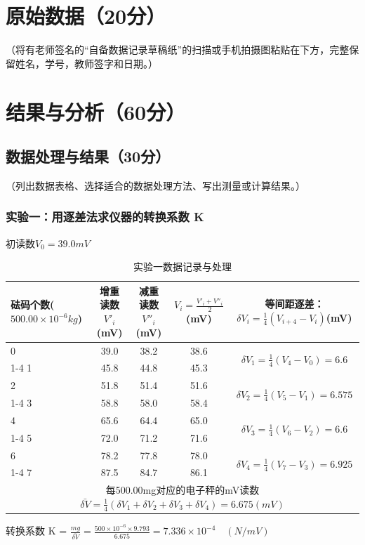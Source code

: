 \documentclass[]{../template/Report}%
\begin{document}
\begin{fullreportonly}
\section{原始数据（20分）}
（将有老师签名的“自备数据记录草稿纸”的扫描或手机拍摄图粘贴在下方，完整保留姓名，学号，教师签字和日期。）

\section{结果与分析（60分）}
\subsection{数据处理与结果（30分）}
（列出数据表格、选择适合的数据处理方法、写出测量或计算结果。）
\subsubsection{实验一：用逐差法求仪器的转换系数 K}
初读数$V_0 = 39.0mV$
\begin{table}[H]
    \centering
    \caption{实验一数据记录与处理}
    \begin{tabular}{|p{6em}|c|c|c|c|}
        \hline
        \textbf{砝码个数($500.00 \times 10^{-6}kg$)} & \textbf{增重读数$V'_i$(mV)} & \textbf{减重读数$V''_i$(mV)} & $V_i = \frac{V'_i + V''_i}{2}$(mV) & \textbf{等间距逐差：$\delta V_i = \frac{1}{4}(V_{i+4} - V_i)$(mV)}  \\
        \hline
        0 & 39.0 & 38.2 & 38.6 & \multirow{2}{*}{$\delta V_1=\frac{1}{4}(V_4-V_0) = 6.6$} \\
        \cline{1-4}
        1 & 45.8 & 44.8 & 45.3 &  \\
        \hline
        2 & 51.8 & 51.4 & 51.6 & \multirow{2}{*}{$\delta V_2=\frac{1}{4}(V_5-V_1) = 6.575$} \\
        \cline{1-4}
        3 & 58.8 & 58.0 & 58.4 &  \\
        \hline
        4 & 65.6 & 64.4 & 65.0 & \multirow{2}{*}{$\delta V_3=\frac{1}{4}(V_6-V_2) = 6.6$} \\
        \cline{1-4}
        5 & 72.0 & 71.2 & 71.6 &  \\
        \hline
        6 & 78.2 & 77.8 & 78.0 & \multirow{2}{*}{$\delta V_4=\frac{1}{4}(V_7-V_3) = 6.925$} \\
        \cline{1-4}
        7 & 87.5 & 84.7 & 86.1 &  \\
        \hline
        \multicolumn{5}{|c|}{每500.00mg对应的电子秤的mV读数$\bar{\delta V} = \frac{1}{4}(\delta V_1 + \delta V_2 + \delta V_3 + \delta V_4) = 6.675(mV)$}  \\
        \hline
    \end{tabular}
\end{table}
转换系数 K = $\frac{mg}{\bar{\delta V}} = \frac{500 \times 10^{-6} \times 9.793}{6.675} = 7.336 \times 10^{-4} \quad (N/mV)$


\end{fullreportonly}
\end{document}
